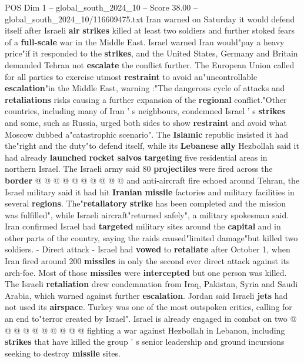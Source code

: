 \begin{textsample}{POS Dim 1 – global\_south\_2024\_10 – Score 38.00 – global\_south\_2024\_10/116609475.txt}  \label{ex:f1_pos_022}
Iran warned on Saturday it would defend itself after Israeli \textbf{air} \textbf{strikes} killed at least two soldiers and further stoked fears of a \textbf{full-scale} war in the Middle East.
Israel warned Iran would"pay a heavy price"if it responded to the \textbf{strikes}, and the United States, Germany and Britain demanded Tehran not \textbf{escalate} the conflict further.
The European Union called for all parties to exercise utmost \textbf{restraint} to avoid an"uncontrollable \textbf{escalation}"in the Middle East, warning :"The dangerous cycle of attacks and \textbf{retaliations} risks causing a further expansion of the \textbf{regional} conflict."Other countries, including many of Iran ' s neighbours, condemned Israel ' s \textbf{strikes} and some, such as Russia, urged both sides to show \textbf{restraint} and avoid what Moscow dubbed a"catastrophic scenario".
The \textbf{Islamic} republic insisted it had the"right and the duty"to defend itself, while its \textbf{Lebanese} \textbf{ally} Hezbollah said it had already \textbf{launched} \textbf{rocket} \textbf{salvos} \textbf{targeting} five residential areas in northern Israel.
The Israeli army said 80 \textbf{projectiles} were fired across the \textbf{border} @ @ @ @ @ @ @ @ @ @ and anti-aircraft fire echoed around Tehran, the Israel military said it had hit \textbf{Iranian} \textbf{missile} factories and military facilities in several \textbf{regions}.
The"\textbf{retaliatory} \textbf{strike} has been completed and the mission was fulfilled", while Israeli aircraft"returned safely", a military spokesman said.
Iran confirmed Israel had \textbf{targeted} military sites around the \textbf{capital} and in other parts of the country, saying the raids caused"limited damage"but killed two soldiers. - Direct attack - Israel had \textbf{vowed} to \textbf{retaliate} after October 1, when Iran fired around 200 \textbf{missiles} in only the second ever direct attack against its arch-foe.
Most of those \textbf{missiles} were \textbf{intercepted} but one person was killed.
The Israeli \textbf{retaliation} drew condemnation from Iraq, Pakistan, Syria and Saudi Arabia, which warned against further \textbf{escalation}.
Jordan said Israeli \textbf{jets} had not used its \textbf{airspace}.
Turkey was one of the most outspoken critics, calling for an end to"terror created by Israel".
Israel is already engaged in combat on two @ @ @ @ @ @ @ @ @ @ fighting a war against Hezbollah in Lebanon, including \textbf{strikes} that have killed the group ' s senior leadership and ground incursions seeking to destroy \textbf{missile} sites.

\end{textsample}
